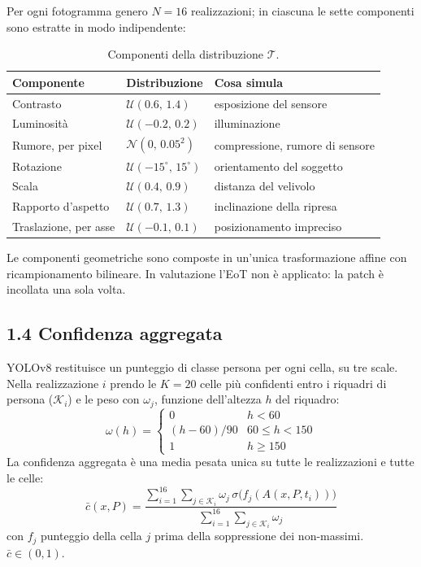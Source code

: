 \documentclass[a4paper, 11pt]{article}
\begin{document}
Per ogni fotogramma genero $N = 16$ realizzazioni; in ciascuna le sette
componenti sono estratte in modo indipendente:

\begin{table}[h]
\centering
\begin{tabular}{lll}
\toprule
\textbf{Componente} & \textbf{Distribuzione} & \textbf{Cosa simula} \\
\midrule
Contrasto & $\mathcal{U}(0.6,\,1.4)$ & esposizione del sensore \\
Luminosità & $\mathcal{U}(-0.2,\,0.2)$ & illuminazione \\
Rumore, per pixel & $\mathcal{N}(0,\,0.05^2)$ & compressione, rumore di sensore \\
Rotazione & $\mathcal{U}(-15^{\circ},\,15^{\circ})$ & orientamento del soggetto \\
Scala & $\mathcal{U}(0.4,\,0.9)$ & distanza del velivolo \\
Rapporto d'aspetto & $\mathcal{U}(0.7,\,1.3)$ & inclinazione della ripresa \\
Traslazione, per asse & $\mathcal{U}(-0.1,\,0.1)$ & posizionamento impreciso \\
\bottomrule
\end{tabular}
\caption{Componenti della distribuzione $\mathcal{T}$.}
\label{tab:eot}
\end{table}

Le componenti geometriche sono composte in un'unica trasformazione affine con
ricampionamento bilineare. In valutazione l'EoT non è applicato: la patch è
incollata una sola volta.

\subsection*{1.4 Confidenza aggregata}

YOLOv8 restituisce un punteggio di classe persona per ogni cella, su tre
scale. Nella realizzazione $i$ prendo le $K = 20$ celle più confidenti entro i
riquadri di persona ($\mathcal{K}_i$) e le peso con $\omega_j$, funzione
dell'altezza $h$ del riquadro:
\begin{equation}
\omega(h) =
\begin{cases}
0 & h < 60 \\
(h - 60)/90 & 60 \le h < 150 \\
1 & h \ge 150
\end{cases}
\end{equation}
La confidenza aggregata è una media pesata unica su tutte le realizzazioni e
tutte le celle:
\begin{equation}
\label{eq:cbar}
\bar{c}(x, P) = \frac{\displaystyle\sum_{i=1}^{16} \sum_{j \in \mathcal{K}_i}
\omega_j \, \sigma\big(f_j(A(x, P, t_i))\big)}
{\displaystyle\sum_{i=1}^{16} \sum_{j \in \mathcal{K}_i} \omega_j}
\end{equation}
con $f_j$ punteggio della cella $j$ prima della soppressione dei non-massimi.
$\bar{c} \in (0,1)$.
\end{document}
